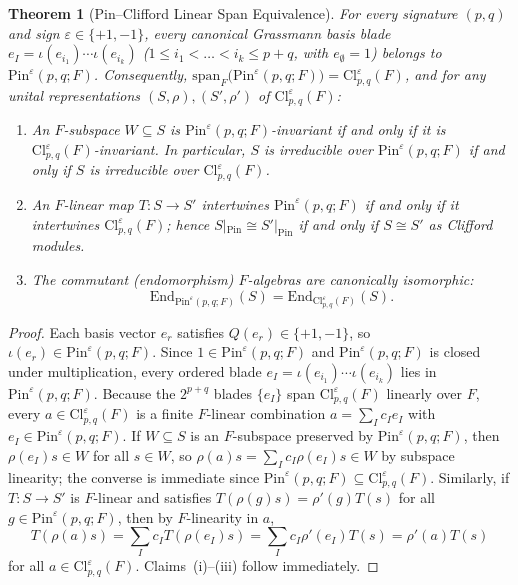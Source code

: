 \documentclass[11pt,a4paper]{article}
\theoremstyle{plain}
\newtheorem{theorem}{Theorem}[section]
\theoremstyle{definition}
\newcommand{\Cl}{\mathrm{Cl}}
\newcommand{\Pin}{\mathrm{Pin}}
\newcommand{\End}{\mathrm{End}}
\begin{document}
\begin{theorem}[Pin--Clifford Linear Span Equivalence]
\label{thm:pin-span}
For every signature $(p,q)$ and sign $\varepsilon \in \{+1,-1\}$, every canonical Grassmann basis blade $e_I = \iota(e_{i_1})\cdots \iota(e_{i_k})$ ($1 \le i_1 < \dots < i_k \le p+q$, with $e_\emptyset = 1$) belongs to $\Pin^\varepsilon(p,q; F)$. Consequently, $\mathrm{span}_F\bigl(\Pin^\varepsilon(p,q; F)\bigr) = \Cl_{p,q}^\varepsilon(F)$, and for any unital representations $(S, \rho), (S', \rho')$ of $\Cl_{p,q}^\varepsilon(F)$:
\begin{enumerate}
\item[(i)] An $F$-subspace $W \subseteq S$ is $\Pin^\varepsilon(p,q; F)$-invariant if and only if it is $\Cl_{p,q}^\varepsilon(F)$-invariant. In particular, $S$ is irreducible over $\Pin^\varepsilon(p,q; F)$ if and only if $S$ is irreducible over $\Cl_{p,q}^\varepsilon(F)$.
\item[(ii)] An $F$-linear map $T : S \to S'$ intertwines $\Pin^\varepsilon(p,q; F)$ if and only if it intertwines $\Cl_{p,q}^\varepsilon(F)$; hence $S|_{\Pin} \cong S'|_{\Pin}$ if and only if $S \cong S'$ as Clifford modules.
\item[(iii)] The commutant (endomorphism) $F$-algebras are canonically isomorphic:
\[
  \End_{\Pin^\varepsilon(p,q; F)}(S) = \End_{\Cl_{p,q}^\varepsilon(F)}(S).
\]
\end{enumerate}
\end{theorem}

\begin{proof}
Each basis vector $e_r$ satisfies $Q(e_r) \in \{+1, -1\}$, so $\iota(e_r) \in \Pin^\varepsilon(p,q; F)$. Since $1 \in \Pin^\varepsilon(p,q; F)$ and $\Pin^\varepsilon(p,q; F)$ is closed under multiplication, every ordered blade $e_I = \iota(e_{i_1})\cdots \iota(e_{i_k})$ lies in $\Pin^\varepsilon(p,q; F)$. Because the $2^{p+q}$ blades $\{e_I\}$ span $\Cl_{p,q}^\varepsilon(F)$ linearly over $F$, every $a \in \Cl_{p,q}^\varepsilon(F)$ is a finite $F$-linear combination $a = \sum_I c_I e_I$ with $e_I \in \Pin^\varepsilon(p,q; F)$. If $W \subseteq S$ is an $F$-subspace preserved by $\Pin^\varepsilon(p,q; F)$, then $\rho(e_I)s \in W$ for all $s \in W$, so $\rho(a)s = \sum_I c_I \rho(e_I)s \in W$ by subspace linearity; the converse is immediate since $\Pin^\varepsilon(p,q; F) \subseteq \Cl_{p,q}^\varepsilon(F)$. Similarly, if $T : S \to S'$ is $F$-linear and satisfies $T(\rho(g)s) = \rho'(g)T(s)$ for all $g \in \Pin^\varepsilon(p,q; F)$, then by $F$-linearity in $a$,
\[
  T(\rho(a)s) = \sum_I c_I T(\rho(e_I)s) = \sum_I c_I \rho'(e_I)T(s) = \rho'(a)T(s)
\]
for all $a \in \Cl_{p,q}^\varepsilon(F)$. Claims~(i)--(iii) follow immediately.
\end{proof}
\end{document}
